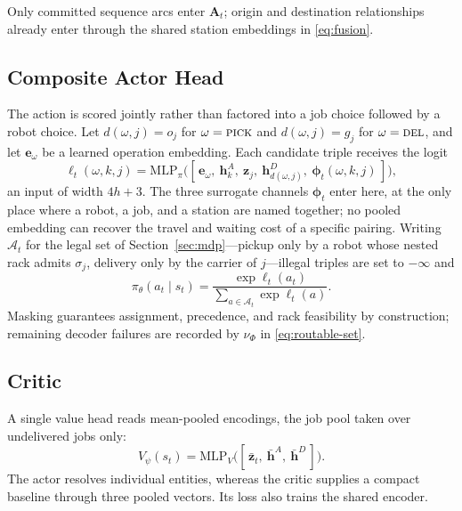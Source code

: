 Only committed sequence arcs enter $\bm A_t$; origin and destination
relationships already enter through the shared station embeddings in
\eqref{eq:fusion}.

\subsection{Composite Actor Head}
\label{sec:arch-actor}

The action is scored jointly rather than factored into a job choice
followed by a robot choice. Let $d(\omega,j)=o_j$ for
$\omega=\textsc{pick}$ and $d(\omega,j)=g_j$ for $\omega=\textsc{del}$, and
let $\bm e_\omega$ be a learned operation embedding. Each candidate triple
receives the logit
\begin{equation}
 \ell_t(\omega,k,j)=\mathrm{MLP}_\pi\big([\,\bm e_\omega,\ \bm h^A_k,\
 \bm z_j,\ \bm h^D_{d(\omega,j)},\ \bm\phi_t(\omega,k,j)\,]\big),
 \label{eq:logit}
\end{equation}
an input of width $4h+3$. The three surrogate channels $\bm\phi_t$ enter
here, at the only place where a robot, a job, and a station are
named together; no pooled embedding can recover the travel and waiting cost
of a specific pairing. Writing $\mathcal A_t$ for the legal set of
Section~\ref{sec:mdp}---pickup only by a robot whose nested rack admits
$\sigma_j$, delivery only by the carrier of $j$---illegal triples are set to
$-\infty$ and
\begin{equation}
 \pi_\theta(a_t\mid s_t)=
 \frac{\exp \ell_t(a_t)}{\sum_{a\in\mathcal A_t}\exp \ell_t(a)} .
 \label{eq:policy}
\end{equation}
Masking guarantees assignment, precedence, and rack feasibility by
construction; remaining decoder failures are recorded by $\nu_\Phi$ in
\eqref{eq:routable-set}.

\subsection{Critic}
\label{sec:arch-critic}

A single value head reads mean-pooled encodings, the job pool taken over
undelivered jobs only:
\begin{equation}
 V_\psi(s_t)=\mathrm{MLP}_V\big([\,\bar{\bm z}_t,\ \bar{\bm h}^A,\
 \bar{\bm h}^D\,]\big).
 \label{eq:critic}
\end{equation}
The actor resolves individual entities, whereas the critic supplies a compact
baseline through three pooled vectors. Its loss also trains the shared
encoder.


